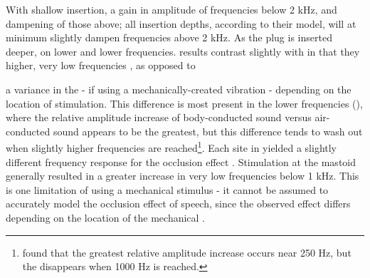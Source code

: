 With shallow insertion, \DIFdelbegin {}\DIFdelend \DIFaddbegin {}\DIFaddend a gain in amplitude of frequencies below 2 kHz, and dampening of those above; all insertion depths, according to their model\DIFaddbegin {}\DIFaddend , will at minimum \DIFdelbegin \DIFdel{, }\DIFdelend slightly dampen frequencies above 2 kHz.  As the plug is inserted deeper, \DIFdelbegin {}\DIFdelend \DIFaddbegin {}\DIFaddend on lower and lower frequencies.  \DIFdelbegin {}\DIFdelend \DIFaddbegin {}\DIFaddend results contrast slightly with \DIFdelbegin {}\DIFdelend \DIFaddbegin {}\DIFaddend %
in that they \DIFdelbegin {}\DIFdelend \DIFaddbegin {}\DIFaddend higher, very low frequencies \DIFaddbegin {}\DIFaddend , as opposed to \DIFdelbegin {}\DIFdelend \DIFaddbegin {}\DIFaddend 


\DIFdelbegin {}\DIFdelend \DIFaddbegin {}\DIFaddend a variance in the \DIFdelbegin {}\DIFdelend \DIFaddbegin {}\DIFaddend - if using a mechanically-created vibration - depending on the location of \DIFaddbegin {}\DIFaddend stimulation.  This difference is most present in the lower frequencies (\cite{dean:00}), where the relative amplitude increase of body-conducted sound versus air-conducted sound appears to be the greatest, but this difference tends to wash out when slightly higher frequencies are reached\footnote{\cite{dean:00} found that the greatest relative amplitude increase occurs near 250 Hz, but the \DIFdelbegin {}\DIFdelend \DIFaddbegin {}\DIFaddend disappears when 1000 Hz is reached.}.  Each \DIFaddbegin {}\DIFaddend site in \cite{stenfelt:07} \DIFdelbegin {}\DIFdelend yielded a slightly different frequency response for the occlusion effect \DIFaddbegin {}\DIFaddend .  Stimulation at the mastoid generally resulted in a greater increase in very low frequencies below 1 kHz.  This is one limitation of using a mechanical stimulus - it cannot be assumed to accurately model the occlusion effect of speech, since the observed effect differs depending on the location of the mechanical \DIFdelbegin {}\DIFdelend \DIFaddbegin {}\DIFaddend .


